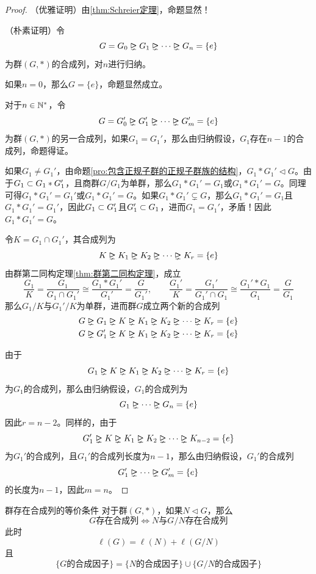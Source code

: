 \begin{proof}
	（优雅证明）由\ref{thm:Schreier定理}，命题显然！
	
	（朴素证明）令
	$$
	G=G_0\rhdneq  G_1 \rhdneq  \cdots \rhdneq   G_n=\{e\}
	$$
	为群$(G,*)$的合成列，对$n$进行归纳。
	
	如果$n=0$，那么$G=\{e\}$，命题显然成立。
	
	对于$n\in\mathbb{N}^*$，令
	$$
	G=G_0'\rhdneq  G_1' \rhdneq  \cdots \rhdneq   G_m'=\{e\}
	$$
	为群$(G,*)$的另一合成列，如果$G_1=G_1'$，那么由归纳假设，$G_1$存在$n-1$的合成列，命题得证。
	
	如果$G_1\ne G_1'$，由命题\ref{pro:包含正规子群的正规子群族的结构}，$G_1*G_1'\lhd G$。由于$G_1\subset G_1*G_1'$，且商群$G/G_1$为单群，那么$G_1*G_1'=G_1$或$G_1*G_1'=G$。同理可得$G_1*G_1'=G_1'$或$G_1*G_1'=G$。如果$G_1*G_1'\subsetneq G$，那么$G_1*G_1'=G_1$且$G_1*G_1'=G_1'$，因此$G_1\subset G_1'$且$G_1'\subset G_1$，进而$G_1=G_1'$，矛盾！因此$G_1*G_1'=G$。
	
	令$K=G_1\cap G_1'$，其合成列为
	$$
	K\rhdneq  K_1\rhdneq  K_2\rhdneq  \cdots \rhdneq   K_r=\{e\}
	$$
	由群第二同构定理\ref{thm:群第二同构定理}，成立
	$$
	\frac{G_1}{K}=\frac{G_1}{G_1\cap G_1'}\cong
	\frac{G_1*G_1'}{G_1'}=\frac{G}{G_1'},\qquad 
	\frac{G_1'}{K}=\frac{G_1'}{G_1'\cap G_1}\cong
	\frac{G_1'*G_1}{G_1}=\frac{G}{G_1}
	$$
	那么$G_1/K$与$G_1'/K$为单群，进而群$G$成立两个新的合成列
	\begin{align*}
		&G\rhdneq  G_1\rhdneq  K\rhdneq  K_1\rhdneq  K_2\rhdneq  \cdots \rhdneq   K_r=\{e\}\\
		&G\rhdneq  G_1'\rhdneq  K\rhdneq  K_1\rhdneq  K_2\rhdneq  \cdots \rhdneq   K_r=\{e\}
	\end{align*}
	
	由于
	$$
	G_1\rhdneq  K\rhdneq  K_1\rhdneq  K_2\rhdneq  \cdots \rhdneq   K_r=\{e\}
	$$
	为$G_1$的合成列，那么由归纳假设，$G_1$的合成列为
	$$
	G_1 \rhdneq  \cdots \rhdneq   G_n=\{e\}
	$$
	因此$r=n-2$。同样的，由于
	$$
	G_1'\rhdneq  K\rhdneq  K_1\rhdneq  K_2\rhdneq  \cdots \rhdneq   K_{n-2}=\{e\}
	$$
	为$G_1'$的合成列，且$G_1'$的合成列长度为$n-1$，那么由归纳假设，$G_1'$的合成列
	$$
	G_1' \rhdneq  \cdots \rhdneq   G_m'=\{e\}
	$$
	的长度为$n-1$，因此$m=n$。
\end{proof}

\begin{proposition}{}{群存在合成列的等价条件}
	对于群$(G,*)$，如果$N\lhd  G$，那么
	$$
	G\text{存在合成列}\iff N\text{与}G/N\text{存在合成列}
	$$
	此时
	$$
	\ell(G)=\ell(N)+\ell(G/N)
	$$
	且
	$$
	\{ G\text{的合成因子} \}=\{ N\text{的合成因子} \}\cup \{ G/N\text{的合成因子} \}
	$$
\end{proposition}

